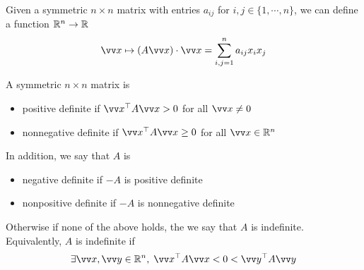 Given a symmetric $n\times n$ matrix with entries $a_{ij}$ for $i,j \in \{1,\cdots, n\}$, we can define a function ${\mathbb R}^n \to {\mathbb R}$
$$
\vv x \mapsto (A\vv x)\cdot \vv x = \sum_{i,j=1}^n a_{ij}x_ix_j
$$

\begin{definition}
A symmetric $n\times n$ matrix is
\begin{itemize}
    \item positive definite if $\vv x^\top A \vv x > 0$ for all $\vv x \neq 0$
    \item nonnegative definite if $\vv x^\top A \vv x \geq 0$ for all $\vv x \in \R^n$
\end{itemize}
In addition, we say that $A$ is
\begin{itemize}
    \item negative definite if $-A$ is positive definite
    \item nonpositive definite if $-A$ is nonnegative definite
\end{itemize}
Otherwise if none of the above holds, the we say that $A$ is indefinite. Equivalently, $A$ is indefinite if
$$
\exists \vv x, \vv y \in \R^n,\; \vv x^\top A \vv x < 0 < \vv y^\top A \vv y
$$
\end{definition}